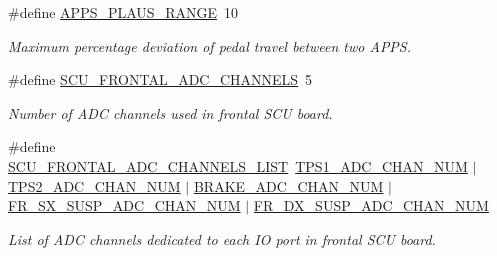 \begin{DoxyCompactItemize}
\mbox{\label{group___board__model__group_ga3e1022cd2e2154437b583f7ff83f2960}} 
\#define \mbox{\hyperlink{group___board__model__group_ga3e1022cd2e2154437b583f7ff83f2960}{A\+P\+P\+S\+\_\+\+P\+L\+A\+U\+S\+\_\+\+R\+A\+N\+GE}}~10
\begin{DoxyCompactList}\small\item\em Maximum percentage deviation of pedal travel between two A\+P\+PS. \end{DoxyCompactList}\item 
\mbox{\label{group___board__model__group_ga99f732ac210a4d6b6635ed58681d3d71}} 
\#define \mbox{\hyperlink{group___board__model__group_ga99f732ac210a4d6b6635ed58681d3d71}{S\+C\+U\+\_\+\+F\+R\+O\+N\+T\+A\+L\+\_\+\+A\+D\+C\+\_\+\+C\+H\+A\+N\+N\+E\+LS}}~5
\begin{DoxyCompactList}\small\item\em Number of A\+DC channels used in frontal S\+CU board. \end{DoxyCompactList}\item 
\mbox{\label{group___board__model__group_ga1b36d02d5fef3342ea7159722fa50ff3}} 
\#define \mbox{\hyperlink{group___board__model__group_ga1b36d02d5fef3342ea7159722fa50ff3}{S\+C\+U\+\_\+\+F\+R\+O\+N\+T\+A\+L\+\_\+\+A\+D\+C\+\_\+\+C\+H\+A\+N\+N\+E\+L\+S\+\_\+\+L\+I\+ST}}~\mbox{\hyperlink{group___board__pinout__group_ga99b2a7dadaf495e3c559a46440f9141f}{T\+P\+S1\+\_\+\+A\+D\+C\+\_\+\+C\+H\+A\+N\+\_\+\+N\+UM}} $\vert$ \mbox{\hyperlink{group___board__pinout__group_ga4cecb8c10512873904099a1a88d69ed3}{T\+P\+S2\+\_\+\+A\+D\+C\+\_\+\+C\+H\+A\+N\+\_\+\+N\+UM}} $\vert$ \mbox{\hyperlink{group___board__pinout__group_ga310547321c4a016c4ad19922920fadfd}{B\+R\+A\+K\+E\+\_\+\+A\+D\+C\+\_\+\+C\+H\+A\+N\+\_\+\+N\+UM}} $\vert$ \mbox{\hyperlink{group___board__pinout__group_ga3582ac3b04abaa9d74b16da2b18a62f9}{F\+R\+\_\+\+S\+X\+\_\+\+S\+U\+S\+P\+\_\+\+A\+D\+C\+\_\+\+C\+H\+A\+N\+\_\+\+N\+UM}} $\vert$ \mbox{\hyperlink{group___board__pinout__group_ga0e9f0303c372af214367d86ad38f660d}{F\+R\+\_\+\+D\+X\+\_\+\+S\+U\+S\+P\+\_\+\+A\+D\+C\+\_\+\+C\+H\+A\+N\+\_\+\+N\+UM}}
\begin{DoxyCompactList}\small\item\em List of A\+DC channels dedicated to each IO port in frontal S\+CU board. \end{DoxyCompactList}\item 

\end{DoxyCompactItemize}
